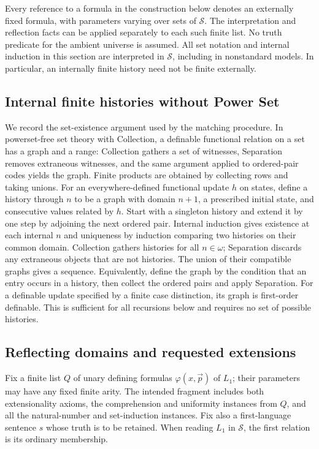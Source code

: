 \documentclass[11pt,a4paper]{article}
\numberwithin{equation}{section}
\theoremstyle{definition}
\theoremstyle{remark}
\begin{document}
Every reference to a formula in the construction below denotes an externally fixed formula, with parameters varying over sets of $\mathcal S$. The interpretation and reflection facts can be applied separately to each such finite list. No truth predicate for the ambient universe is assumed. All set notation and internal induction in this section are interpreted in $\mathcal S$, including in nonstandard models. In particular, an internally finite history need not be finite externally.

\subsection{Internal finite histories without Power Set}\label{sec:histories}
We record the set-existence argument used by the matching procedure. In powerset-free set theory with Collection, a definable functional relation on a set has a graph and a range: Collection gathers a set of witnesses, Separation removes extraneous witnesses, and the same argument applied to ordered-pair codes yields the graph. Finite products are obtained by collecting rows and taking unions. For an everywhere-defined functional update $h$ on states, define a history through $n$ to be a graph with domain $n+1$, a prescribed initial state, and consecutive values related by $h$. Start with a singleton history and extend it by one step by adjoining the next ordered pair. Internal induction gives existence at each internal $n$ and uniqueness by induction comparing two histories on their common domain. Collection gathers histories for all $n\in\omega$; Separation discards any extraneous objects that are not histories. The union of their compatible graphs gives a sequence. Equivalently, define the graph by the condition that an entry occurs in a history, then collect the ordered pairs and apply Separation. For a definable update specified by a finite case distinction, its graph is first-order definable. This is sufficient for all recursions below and requires no set of possible histories.

\subsection{Reflecting domains and requested extensions}\label{sec:regions}
Fix a finite list $Q$ of unary defining formulas $\varphi(x,\vec p)$ of $L_1$; their parameters may have any fixed finite arity. The intended fragment includes both extensionality axioms, the comprehension and uniformity instances from $Q$, and all the natural-number and set-induction instances. Fix also a first-language sentence $s$ whose truth is to be retained. When reading $L_1$ in $\mathcal S$, the first relation is its ordinary membership.
\end{document}
